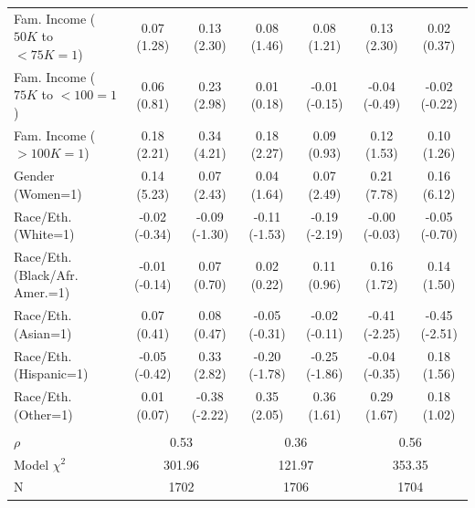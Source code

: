 \documentclass[11pt]{article}
\begin{document}
\begin{landscape}
\begin{table}[t]
\begin{tabular}{l*{6}{c}}
Fam. Income ($50K$ to $<75K=1$)   &0.07 (1.28)&0.13 (2.30)&0.08 (1.46)&0.08 (1.21)&0.13 (2.30)&0.02 (0.37)\\
Fam. Income ($75K$ to $<100=1$)   &0.06 (0.81)&0.23 (2.98)&0.01 (0.18)&-0.01 (-0.15)&-0.04 (-0.49)&-0.02 (-0.22)\\
Fam. Income ($>100K=1$)         &0.18 (2.21)&0.34 (4.21)&0.18 (2.27)&0.09 (0.93)&0.12 (1.53)&0.10 (1.26)\\
Gender (Women=1)              &0.14 (5.23)&0.07 (2.43)&0.04 (1.64)&0.07 (2.49)&0.21 (7.78)&0.16 (6.12)\\
Race/Eth. (White=1)           &-0.02 (-0.34)&-0.09 (-1.30)&-0.11 (-1.53)&-0.19 (-2.19)&-0.00 (-0.03)&-0.05 (-0.70)\\
Race/Eth. (Black/Afr. Amer.=1)&-0.01 (-0.14)&0.07 (0.70)&0.02 (0.22)&0.11 (0.96)&0.16 (1.72)&0.14 (1.50)\\
Race/Eth. (Asian=1)           &0.07 (0.41)&0.08 (0.47)&-0.05 (-0.31)&-0.02 (-0.11)&-0.41 (-2.25)&-0.45 (-2.51)\\
Race/Eth. (Hispanic=1)        &-0.05 (-0.42)&0.33 (2.82)&-0.20 (-1.78)&-0.25 (-1.86)&-0.04 (-0.35)&0.18 (1.56)\\
Race/Eth. (Other=1)           &0.01 (0.07)&-0.38 (-2.22)&0.35 (2.05)&0.36 (1.61)&0.29 (1.67)&0.18 (1.02)\\ \\
$\rho$&\multicolumn{2}{c}{0.53}&\multicolumn{2}{c}{0.36}&\multicolumn{2}{c}{0.56}\\
Model $\chi^{2}$&\multicolumn{2}{c}{301.96}&\multicolumn{2}{c}{121.97}&\multicolumn{2}{c}{353.35}\\
N&\multicolumn{2}{c}{1702}&\multicolumn{2}{c}{1706}&\multicolumn{2}{c}{1704}\\
\hline
\end{tabular}
\label{tab2a}
\end{table}
\end{landscape}
\end{document}
